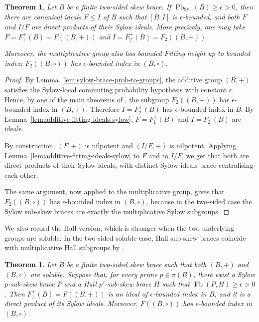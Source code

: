 \documentclass[10pt,a4paper]{amsart}
\numberwithin{equation}{section}
\newtheorem{thm}[equation]{Theorem}
\newcommand{\Pb}{\operatorname{Pb} }
\newcommand{\Syl}{\operatorname{Syl} }
\begin{document}
\begin{thm}
\label{thm:sylow-fitting-two-sided-strong}
Let $B$ be a finite two-sided skew brace. If $\Pb_{\Syl}(B)\geqslant\epsilon>0$,
then there are canonical ideals $F\leqslant I$ of $B$ such that $[B:I]$ is
$\epsilon$-bounded, and both $F$ and $I/F$ are direct products of their
Sylow ideals. More precisely, one may take
$F=F^+_1(B)=F((B,+))$ and $I=F^+_2(B)=F_2((B,+))$.

Moreover, the multiplicative group also has bounded Fitting height up to
bounded index: $F_2((B,\circ))$ has $\epsilon$-bounded index in
$(B,\circ)$.
\end{thm}

\begin{proof}
By Lemma~\ref{lem:sylow-brace-prob-to-groups}, the additive group $(B,+)$
satisfies the Sylow-local commuting probability hypothesis with constant
$\epsilon$. Hence, by one of the main theorems of \cite{DLMS25}, the subgroup $F_2((B,+))$ has
$\epsilon$-bounded index in $(B,+)$. Therefore $I=F^+_2(B)$ has
$\epsilon$-bounded index in $B$. By Lemma~\ref{lem:additive-fitting-ideals-sylow},
$F=F^+_1(B)$ and $I=F^+_2(B)$ are ideals.

By construction, $(F,+)$ is nilpotent and $(I/F,+)$ is nilpotent. Applying
Lemma~\ref{lem:additive-fitting-ideals-sylow} to $F$ and to $I/F$, we get
that both are direct products of their Sylow ideals, with distinct Sylow
ideals brace-centralising each other.

The same argument, now applied to the multiplicative group, gives that
$F_2((B,\circ))$ has $\epsilon$-bounded index in $(B,\circ)$, because in
the two-sided case the Sylow sub-skew braces are exactly the multiplicative
Sylow subgroups.
\end{proof}



We also record the Hall version, which is stronger when the two underlying
groups are soluble. In the two-sided soluble case, Hall sub-skew braces
coincide with multiplicative Hall subgroups by \cite[Theorem 14]{CDMFT26}.

\begin{thm} %
Let $B$ be a finite two-sided skew brace such that both $(B,+)$ and
$(B,\circ)$ are soluble. Suppose that, for every prime $p\in\pi(B)$, there
exist a Sylow $p$-sub-skew brace $P$ and a Hall $p'$-sub-skew brace $H$
such that $\Pb(P,H)\geqslant\epsilon>0$. Then $F^+_1(B)=F((B,+))$ is an ideal
of $\epsilon$-bounded index in $B$, and it is a direct product of its
Sylow ideals. Moreover, $F((B,\circ))$ has $\epsilon$-bounded index in
$(B,\circ)$.
\end{thm}
\end{document}
